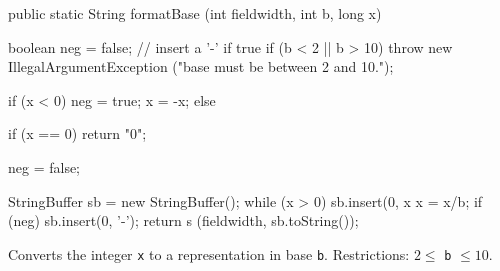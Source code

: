 \begin{htmlonly}
\end{htmlonly}\begin{code}

   public static String formatBase (int fieldwidth, int b, long x)\begin{hide} {
      boolean neg = false;                   // insert a '-' if true
      if (b < 2 || b > 10)
         throw new IllegalArgumentException ("base must be between 2 and 10.");

      if (x < 0) {
         neg = true;
         x = -x;
      } else {
         if (x == 0)
            return "0";

         neg = false;
      }
      StringBuffer sb = new StringBuffer();
      while (x > 0) {
         sb.insert(0, x %
         x = x/b;
      }
      if (neg)
         sb.insert(0, '-');
      return s (fieldwidth, sb.toString());
   }\end{hide}
\end{code}
\begin{tabb} Converts the integer \texttt{x} to a  representation in base
\texttt{b}. Restrictions: $2\le$ \texttt{b} $\le 10$.
\end{tabb}
\begin{htmlonly}
\end{htmlonly}
%
